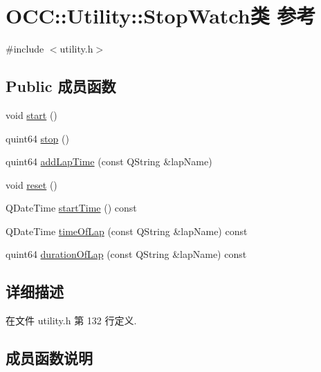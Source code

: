 \hypertarget{class_o_c_c_1_1_utility_1_1_stop_watch}{}\section{O\+CC\+:\+:Utility\+:\+:Stop\+Watch类 参考}
\label{class_o_c_c_1_1_utility_1_1_stop_watch}


{\ttfamily \#include $<$utility.\+h$>$}

\subsection*{Public 成员函数}
\begin{DoxyCompactItemize}
\item 
void \hyperlink{class_o_c_c_1_1_utility_1_1_stop_watch_a3c0e7f07949d231a9d46f4e67da4ba39}{start} ()
\item 
quint64 \hyperlink{class_o_c_c_1_1_utility_1_1_stop_watch_af260179623ea9f1bff299c70276b7e71}{stop} ()
\item 
quint64 \hyperlink{class_o_c_c_1_1_utility_1_1_stop_watch_a0216c1a7ce1dd9e08987af6cee13fa57}{add\+Lap\+Time} (const Q\+String \&lap\+Name)
\item 
void \hyperlink{class_o_c_c_1_1_utility_1_1_stop_watch_aa33acb40dafb0abb7d0d818974be48a2}{reset} ()
\item 
Q\+Date\+Time \hyperlink{class_o_c_c_1_1_utility_1_1_stop_watch_accdc7ba145b66317c86130a83232aa7b}{start\+Time} () const
\item 
Q\+Date\+Time \hyperlink{class_o_c_c_1_1_utility_1_1_stop_watch_a2469e4be115083023be93a579e66e1f7}{time\+Of\+Lap} (const Q\+String \&lap\+Name) const
\item 
quint64 \hyperlink{class_o_c_c_1_1_utility_1_1_stop_watch_a88ed0ba1f54a37aaf803eb644ebbd631}{duration\+Of\+Lap} (const Q\+String \&lap\+Name) const
\end{DoxyCompactItemize}


\subsection{详细描述}


在文件 utility.\+h 第 132 行定义.



\subsection{成员函数说明}
\mbox{\label{class_o_c_c_1_1_utility_1_1_stop_watch_a0216c1a7ce1dd9e08987af6cee13fa57}} 
